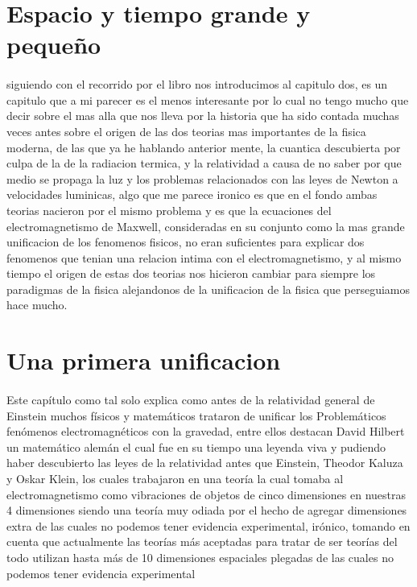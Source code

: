 \documentclass[12pt]{article}
\begin{document}
\section*{Espacio y tiempo grande y pequeño}
\paragraph*{}
\textsf{siguiendo con el recorrido por el libro nos introducimos al capitulo dos, es un capitulo que a mi parecer es el menos interesante
por lo cual no tengo mucho que decir sobre el mas alla que nos lleva por la historia que ha sido contada muchas veces antes sobre el origen
de las dos teorias mas importantes de la fisica moderna, de las que ya he hablando anterior mente, la cuantica descubierta por culpa de la 
de la radiacion termica, y la relatividad a causa de no saber por que medio se propaga la luz y los problemas relacionados con las leyes de 
Newton a velocidades luminicas, algo que me parece ironico es que en el fondo ambas teorias nacieron por el mismo problema y es que la ecuaciones 
del electromagnetismo de Maxwell, consideradas en su conjunto como la mas grande unificacion de los fenomenos fisicos, no eran suficientes para
explicar dos fenomenos que tenian una relacion intima con el electromagnetismo, y al mismo tiempo el origen de estas dos teorias nos hicieron 
cambiar para siempre los paradigmas de la fisica alejandonos de la unificacion de la fisica que perseguiamos hace mucho.}
\section*{Una primera unificacion}
\paragraph*{}
\textsf{Este capítulo como tal solo explica como antes de la relatividad general de Einstein muchos físicos y matemáticos trataron de unificar los
Problemáticos fenómenos electromagnéticos con la gravedad, entre ellos destacan David Hilbert un matemático alemán el cual fue en su tiempo
una leyenda viva y pudiendo haber descubierto las leyes de la relatividad antes que Einstein, Theodor Kaluza y Oskar Klein, los cuales trabajaron
en una teoría la cual tomaba al electromagnetismo como vibraciones de objetos de cinco dimensiones en nuestras 4 dimensiones siendo una teoría 
muy odiada por el hecho de agregar dimensiones extra de las cuales no podemos tener evidencia experimental, irónico, tomando en cuenta que actualmente
las teorías más aceptadas para tratar de ser teorías del todo utilizan hasta más de 10 dimensiones espaciales plegadas de las cuales no podemos
tener evidencia experimental}
\end{document}
